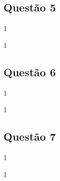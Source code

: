 \documentclass{article}
\begin{document}
\newpage
        \subsection{Questão 5}
            \begin{exercise}
                1
            \end{exercise}
            \begin{resolution}
                1
            \end{resolution}

\newpage
        \subsection{Questão 6}
            \begin{exercise}
                1
            \end{exercise}
            \begin{resolution}
                1
            \end{resolution}

\newpage
        \subsection{Questão 7}
            \begin{exercise}
                1
            \end{exercise}
            \begin{resolution}
                1
            \end{resolution}
\end{document}
